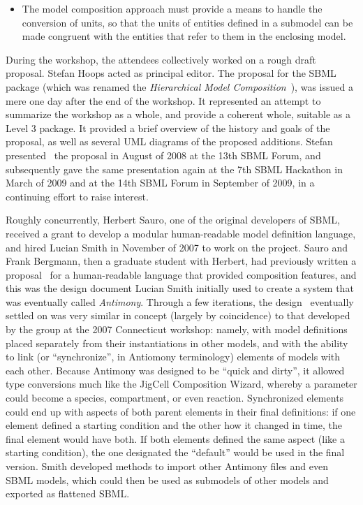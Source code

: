 \begin{enumerate}
\begin{itemize}
    \item The model composition approach must provide a means to handle
      the conversion of units, so that the units of entities defined in
      a submodel can be made congruent with the entities that refer to
      them in the enclosing model.

    \end{itemize}

\end{enumerate}

During the workshop, the attendees collectively worked on a rough draft
proposal.  Stefan Hoops acted as principal editor.  The proposal for the
SBML package (which was renamed the \emph{Hierarchical Model
  Composition}~\cite{}), was issued a mere one day after the end of the
workshop.  It represented an attempt to summarize the workshop as a
whole, and provide a coherent whole, suitable as a Level 3 package.  It
provided a brief overview of the history and goals of the proposal, as
well as several UML diagrams of the proposed additions.  Stefan
presented~\cite{} the proposal in August of 2008 at the 13th SBML Forum,
and subsequently gave the same presentation again at the 7th SBML
Hackathon in March of 2009 and at the 14th SBML Forum in September of
2009, in a continuing effort to raise interest.

Roughly concurrently, Herbert Sauro, one of the original developers of
SBML, received a grant to develop a modular human-readable model
definition language, and hired Lucian Smith in November of 2007 to work
on the project.  Sauro and Frank Bergmann, then a graduate student with
Herbert, had previously written a proposal~\cite{} for a human-readable
language that provided composition features, and this was the design
document Lucian Smith initially used to create a system that was
eventually called \emph{Antimony}. Through a few iterations, the
design~\cite{} eventually settled on was very similar in concept
(largely by coincidence) to that developed by the group at the 2007
Connecticut workshop: namely, with model definitions placed separately
from their instantiations in other models, and with the ability to link
(or ``synchronize'', in Antiomony terminology) elements of models with
each other.  Because Antimony was designed to be ``quick and dirty'', it
allowed type conversions much like the JigCell Composition Wizard,
whereby a parameter could become a species, compartment, or even
reaction.  Synchronized elements could end up with aspects of both
parent elements in their final definitions: if one element defined a
starting condition and the other how it changed in time, the final
element would have both.  If both elements defined the same aspect (like
a starting condition), the one designated the ``default'' would be used
in the final version.  Smith developed methods to import other Antimony
files and even SBML models, which could then be used as submodels of
other models and exported as flattened SBML.

